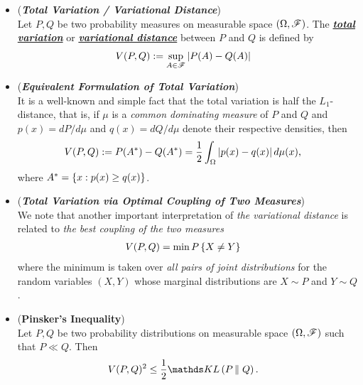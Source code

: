\documentclass[11pt]{article}
\begin{document}
\begin{itemize}
\item \begin{definition} (\emph{\textbf{Total Variation / Variational Distance}})\\
Let $P, Q$ be two probability measures on measurable space $(\Omega, {\mathscr F})$. The \underline{\emph{\textbf{total variation}}} or \underline{\emph{\textbf{variational distance}}} between $P$ and $Q$ is defined by
\begin{align}
V(P,Q) &:= \sup_{A \in {\mathscr F}}\left\lvert P(A) - Q(A) \right\rvert \label{def: total_variation_prob}
\end{align}
\end{definition}

\item \begin{remark} (\emph{\textbf{Equivalent Formulation of Total Variation}})\\
It is a well-known and simple fact that the total variation is half the $L_1$-distance, that is, if $\mu$ is a \emph{common dominating measure} of $P$ and $Q$ and $p(x) = dP/d\mu$ and $q(x) = dQ /d\mu$ denote their respective densities, then
\begin{align}
V(P,Q) &:= P(A^{*}) - Q(A^{*}) = \frac{1}{2}\int_{\Omega}\left\lvert p(x) - q(x) \right\rvert d\mu(x), \label{def: total_variation_l1}
\end{align} where $A^{*} = \left\{x: p(x) \ge q(x)\right\}$.
\end{remark}

\item \begin{remark} (\emph{\textbf{Total Variation via Optimal Coupling of Two Measures}})\\
We note that another important interpretation of \emph{the variational distance} is related to \emph{the best coupling of the two measures}
\begin{align}
V(P,Q) &= \min P\left\{X \neq Y\right\}
\end{align} where the minimum is taken over \emph{all pairs of joint distributions} for the random variables $(X, Y)$ whose marginal distributions are $X \sim P$ and $Y \sim Q$. 
\end{remark}

\item \begin{proposition} (\textbf{Pinsker's Inequality}) \citep{thomas2006elements, boucheron2013concentration} \\
Let $P, Q$ be two probability distributions on measurable space $(\Omega, {\mathscr F})$ such that $P \ll Q$. Then
\begin{align}
V(P, Q)^2 &\le \frac{1}{2}\kl{P}{Q}. \label{ineqn: pinsker_inequality}
\end{align}
\end{proposition}


\end{itemize}
\end{document}
